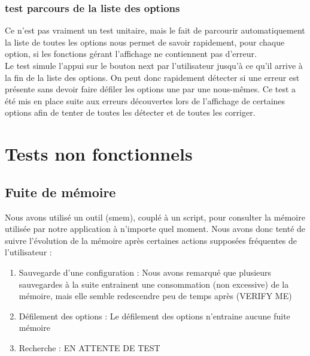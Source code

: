 \documentclass[16pts]{report}
\begin{document}
\subsubsection{test parcours de la liste des options}

Ce n'est pas vraiment un test unitaire, mais le fait de parcourir 
automatiquement la liste de toutes les options nous permet de savoir rapidement,
pour chaque option, si les fonctions gérant l'affichage ne contiennent pas 
d'erreur.
\\

Le test simule l'appui sur le bouton next par l'utilisateur jusqu'à ce qu'il
arrive à la fin de la liste des options. On peut donc rapidement détecter si 
une erreur est présente sans devoir faire défiler les options une par une nous-mêmes. Ce test a été mis en place suite aux erreurs découvertes lors de
l'affichage de certaines options afin de tenter de toutes les détecter et de 
toutes les corriger.\\


    \section{Tests non fonctionnels}
    \label{sec:Tests non fonctionnels}

\subsection{Fuite de mémoire}

Nous avons utilisé un outil (smem), couplé à un script, pour consulter la 
mémoire utilisée par notre application à n'importe quel moment. Nous avons 
donc tenté de suivre l'évolution de la mémoire après certaines actions supposées
fréquentes de l'utilisateur : \\

\begin{enumerate}
	\item Sauvegarde d'une configuration : Nous avons remarqué que 
          plusieurs sauvegardes à la suite entrainent une consommation 
          (non excessive) de la mémoire, mais elle semble redescendre
          peu de temps après (VERIFY ME)

	\item Défilement des options : Le défilement des options n'entraine
          aucune fuite mémoire

	\item Recherche : EN ATTENTE DE TEST 
\end{enumerate}
\end{document}
